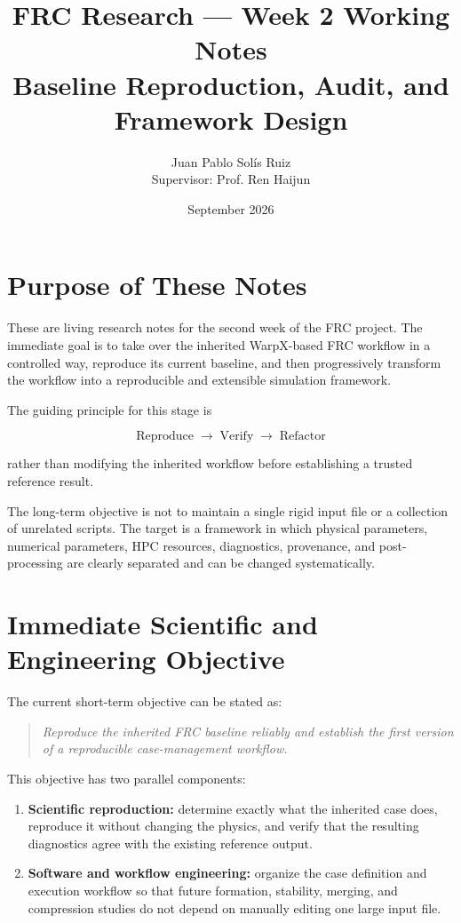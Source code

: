 \documentclass[11pt,a4paper]{article}
\title{\textbf{FRC Research --- Week 2 Working Notes}\\
\large Baseline Reproduction, Audit, and Framework Design}
\author{Juan Pablo Solís Ruiz\\
Supervisor: Prof. Ren Haijun}
\date{September 2026}
\begin{document}
\maketitle
\tableofcontents
\newpage

\section{Purpose of These Notes}

These are living research notes for the second week of the FRC project. The immediate goal is to take over the inherited WarpX-based FRC workflow in a controlled way, reproduce its current baseline, and then progressively transform the workflow into a reproducible and extensible simulation framework.

The guiding principle for this stage is

\[
\boxed{\text{Reproduce} \;\rightarrow\; \text{Verify} \;\rightarrow\; \text{Refactor}}
\]

rather than modifying the inherited workflow before establishing a trusted reference result.

The long-term objective is not to maintain a single rigid input file or a collection of unrelated scripts. The target is a framework in which physical parameters, numerical parameters, HPC resources, diagnostics, provenance, and post-processing are clearly separated and can be changed systematically.

\section{Immediate Scientific and Engineering Objective}

The current short-term objective can be stated as:

\begin{quote}
\textit{Reproduce the inherited FRC baseline reliably and establish the first version of a reproducible case-management workflow.}
\end{quote}

This objective has two parallel components:

\begin{enumerate}[label=\arabic*.]
    \item \textbf{Scientific reproduction:} determine exactly what the inherited case does, reproduce it without changing the physics, and verify that the resulting diagnostics agree with the existing reference output.
    \item \textbf{Software and workflow engineering:} organize the case definition and execution workflow so that future formation, stability, merging, and compression studies do not depend on manually editing one large input file.
\end{enumerate}
\end{document}
